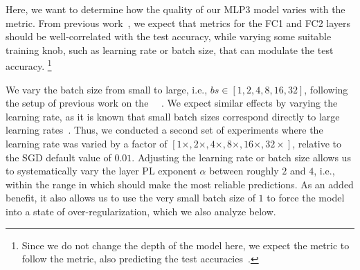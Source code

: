 Here, we want to determine how the quality of our MLP3 model varies with the \ALPHA metric. 
From previous work~\cite{MM20a_trends_NatComm,MM21a_simpsons_TR,YTHx22_TR}, we expect that \ALPHA metrics for the FC1 and FC2 layers should be well-correlated with the test accuracy, while varying some suitable training knob, such as learning rate or batch size, that can modulate the test accuracy.%
\footnote{Since we do not change the depth of the model here, we expect the \ALPHA metric to follow the \ALPHAHAT metric, also predicting the test accuracies~\cite{MM21a_simpsons_TR}.}

We vary the batch size from small to large, i.e., $bs\in[1,2,4,8,16,32]$, following the setup of previous work on the \HTSR~\Phenomenology~\cite{MM18_TR_JMLRversion}. 
We expect similar effects by varying the learning rate, as it is known that small batch sizes correspond directly to large learning rates~\cite{SKYL17_TR,WT11}. 
Thus, we conducted a second set of experiments where the learning rate was varied by a factor of 
$[1\times,2\times,4\times,8\times,16\times,32\times]$, relative to the SGD default value of $0.01$. 
Adjusting the learning rate or batch size allows us to systematically vary the layer PL exponent $\alpha$ between roughly $2$ and $4$, i.e., within the range in which \SETOL should make the most reliable predictions. 
As an added benefit, it also allows us to use the very small batch size of $1$ to force the model into a state of over-regularization, which we also analyze below.


